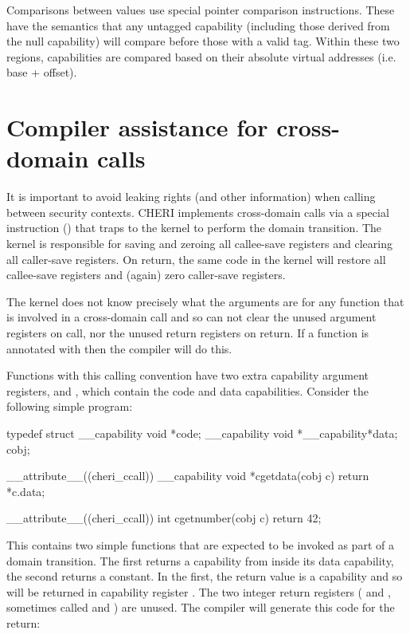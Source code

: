 Comparisons between  values use special pointer comparison instructions.  These have the semantics that any untagged capability (including those derived from the null capability) will compare before those with a valid tag.  Within these two regions, capabilities are compared based on their absolute virtual addresses (i.e. base + offset).

\section{Compiler assistance for cross-domain calls}

It is important to avoid leaking rights (and other information) when calling between security contexts.  CHERI implements cross-domain calls via a special instruction () that traps to the kernel to perform the domain transition.  The kernel is responsible for saving and zeroing all callee-save registers and clearing all caller-save registers.  On return, the same code in the kernel will restore all callee-save registers and (again) zero caller-save registers.

The kernel does not know precisely what the arguments are for any function that is involved in a cross-domain call and so can not clear the unused argument registers on call, nor the unused return registers on return.  If a function is annotated with  then the compiler will do this.  

Functions with this calling convention have two extra capability argument registers,  and , which contain the code and data capabilities.  Consider the following simple program:

\begin{csnippet}
typedef struct
{
	__capability void *code;
	__capability void *__capability*data;
} cobj;

__attribute__((cheri_ccall))
__capability void *cgetdata(cobj c)
{
	return *c.data;
}

__attribute__((cheri_ccall))
int cgetnumber(cobj c)
{
	return 42;
}
\end{csnippet}

This contains two simple functions that are expected to be invoked as part of a domain transition.  The first returns a capability from inside its data capability, the second returns a constant.  In the first, the return value is a capability and so will be returned in capability register .  The two integer return registers ( and , sometimes called  and ) are unused.  The compiler will generate this code for the return:

